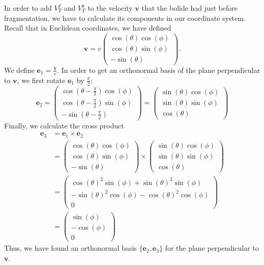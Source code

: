In order to add $V_T^f$ and $V_T^b$ to the velocity $\pmb{v}$ that the bolide had just before fragmentation,
we have to calculate its components in our coordinate system.
Recall that in Euclidean coordinates, we have defined
\begin{equation*}
    \pmb{v} = v \begin{pmatrix}
        \cos(\theta)\cos(\phi) \\
        \cos(\theta)\sin(\phi) \\
        -\sin(\theta)
    \end{pmatrix}.
\end{equation*}
We define $\pmb{e}_1 = \frac{\pmb{v}}{v}$.
In order to get an orthonormal basis of the plane perpendicular to $\pmb{v}$, we first rotate $\pmb{e}_1$ by $\frac{\pi}{2}$:
\begin{equation*}
    \pmb{e}_2 = \begin{pmatrix}
        \cos\left(\theta - \frac{\pi}{2}\right)\cos(\phi) \\
        \cos\left(\theta - \frac{\pi}{2}\right)\sin(\phi) \\
        -\sin\left(\theta - \frac{\pi}{2}\right)
    \end{pmatrix} = \begin{pmatrix}
        \sin(\theta)\cos(\phi) \\
        \sin(\theta)\sin(\phi) \\
        \cos(\theta)
    \end{pmatrix}
\end{equation*}
Finally, we calculate the cross product
\begin{align*}
    \pmb{e}_3 &= \pmb{e}_1 \times \pmb{e}_2 \\
    &= \begin{pmatrix}
        \cos(\theta)\cos(\phi) \\
        \cos(\theta)\sin(\phi) \\
        -\sin(\theta)
    \end{pmatrix} \times \begin{pmatrix}
        \sin(\theta)\cos(\phi) \\
        \sin(\theta)\sin(\phi) \\
        \cos(\theta)
    \end{pmatrix} \\
    &= \begin{pmatrix}
        \cos(\theta)^2\sin(\phi) + \sin(\theta)^2\sin(\phi) \\
        -\sin(\theta)^2\cos(\phi) - \cos(\theta)^2\cos(\phi) \\
        0
    \end{pmatrix} \\
    &= \begin{pmatrix}
        \sin(\phi) \\
        -\cos(\phi) \\
        0
    \end{pmatrix}
\end{align*}
Thus, we have found an orthonormal basis $\{\pmb{e}_2, \pmb{e}_3\}$ for the plane perpendicular to $\pmb{v}$.

